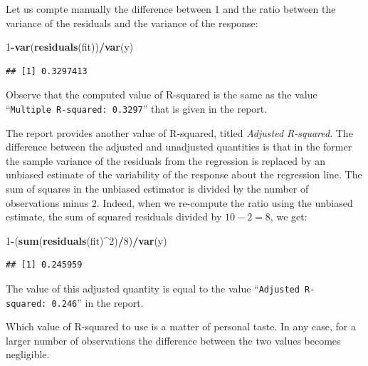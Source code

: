 \documentclass[
]{krantz}
\makeatletter
\newenvironment{Shaded}{\begin{snugshade}}{\end{snugshade}}
\newcommand{\DecValTok}[1]{\textcolor[rgb]{0.00,0.00,0.81}{#1}}
\newcommand{\KeywordTok}[1]{\textcolor[rgb]{0.13,0.29,0.53}{\textbf{#1}}}
\newcommand{\NormalTok}[1]{#1}
\newcommand{\OperatorTok}[1]{\textcolor[rgb]{0.81,0.36,0.00}{\textbf{#1}}}
\newenvironment{kframe}{%
\medskip{}
\setlength{\fboxsep}{.8em}
 \def\at@end@of@kframe{}%
 \ifinner\ifhmode%
  \def\at@end@of@kframe{\end{minipage}}%
  \begin{minipage}{\columnwidth}%
 \fi\fi%
 \def\FrameCommand##1{\hskip\@totalleftmargin \hskip-\fboxsep
 \colorbox{shadecolor}{##1}\hskip-\fboxsep
     \hskip-\linewidth \hskip-\@totalleftmargin \hskip\columnwidth}%
 \MakeFramed {\advance\hsize-\width
   \@totalleftmargin\z@ \linewidth\hsize
   \@setminipage}}%
 {\par\unskip\endMakeFramed%
 \at@end@of@kframe}
\renewenvironment{Shaded}{\begin{kframe}}{\end{kframe}}
\theoremstyle{definition}
\theoremstyle{definition}
\theoremstyle{definition}
\theoremstyle{remark}
\makeatother
\begin{document}
Let us compte manually the difference between 1 and the ratio between
the variance of the residuals and the variance of the response:

\begin{Shaded}
\begin{Highlighting}[]
\DecValTok{1}\OperatorTok{-}\KeywordTok{var}\NormalTok{(}\KeywordTok{residuals}\NormalTok{(fit))}\OperatorTok{/}\KeywordTok{var}\NormalTok{(y)}
\end{Highlighting}
\end{Shaded}

\begin{verbatim}
## [1] 0.3297413
\end{verbatim}

Observe that the computed value of R-squared is the same as the value
``\texttt{Multiple\ R-squared:\ 0.3297}'' that is given in the report.

The report provides another value of R-squared, titled \emph{Adjusted
R-squared}. The difference between the adjusted and unadjusted
quantities is that in the former the sample variance of the residuals
from the regression is replaced by an unbiased estimate of the
variability of the response about the regression line. The sum of
squares in the unbiased estimator is divided by the number of
observations minus 2. Indeed, when we re-compute the ratio using the
unbiased estimate, the sum of squared residuals divided by \(10 - 2 = 8\),
we get:

\begin{Shaded}
\begin{Highlighting}[]
\DecValTok{1}\OperatorTok{-}\NormalTok{(}\KeywordTok{sum}\NormalTok{(}\KeywordTok{residuals}\NormalTok{(fit)}\OperatorTok{^}\DecValTok{2}\NormalTok{)}\OperatorTok{/}\DecValTok{8}\NormalTok{)}\OperatorTok{/}\KeywordTok{var}\NormalTok{(y)}
\end{Highlighting}
\end{Shaded}

\begin{verbatim}
## [1] 0.245959
\end{verbatim}

The value of this adjusted quantity is equal to the value
``\texttt{Adjusted\ R-squared:\ 0.246}'' in the report.

Which value of R-squared to use is a matter of personal taste. In any
case, for a larger number of observations the difference between the two
values becomes negligible.
\end{document}
